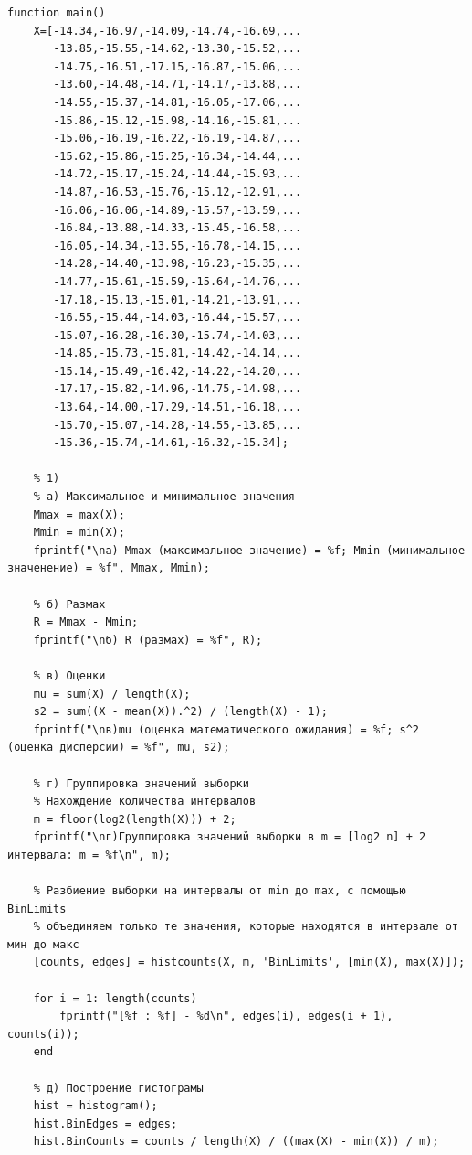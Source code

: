 \documentclass[a4paper,oneside,12pt]{extreport}
\theoremstyle{indented}
\begin{document}
\hfill 
\begin{lstlisting}[caption=Реализация]
function main()
    X=[-14.34,-16.97,-14.09,-14.74,-16.69,...
       -13.85,-15.55,-14.62,-13.30,-15.52,...
       -14.75,-16.51,-17.15,-16.87,-15.06,...
       -13.60,-14.48,-14.71,-14.17,-13.88,...
       -14.55,-15.37,-14.81,-16.05,-17.06,...
       -15.86,-15.12,-15.98,-14.16,-15.81,...
       -15.06,-16.19,-16.22,-16.19,-14.87,...
       -15.62,-15.86,-15.25,-16.34,-14.44,...
       -14.72,-15.17,-15.24,-14.44,-15.93,...
       -14.87,-16.53,-15.76,-15.12,-12.91,...
       -16.06,-16.06,-14.89,-15.57,-13.59,...
       -16.84,-13.88,-14.33,-15.45,-16.58,...
       -16.05,-14.34,-13.55,-16.78,-14.15,...
       -14.28,-14.40,-13.98,-16.23,-15.35,...
       -14.77,-15.61,-15.59,-15.64,-14.76,...
       -17.18,-15.13,-15.01,-14.21,-13.91,...
       -16.55,-15.44,-14.03,-16.44,-15.57,...
       -15.07,-16.28,-16.30,-15.74,-14.03,...
       -14.85,-15.73,-15.81,-14.42,-14.14,...
       -15.14,-15.49,-16.42,-14.22,-14.20,...
       -17.17,-15.82,-14.96,-14.75,-14.98,...
       -13.64,-14.00,-17.29,-14.51,-16.18,...
       -15.70,-15.07,-14.28,-14.55,-13.85,...
       -15.36,-15.74,-14.61,-16.32,-15.34];
    
    % 1)
    % а) Максимальное и минимальное значения
    Mmax = max(X);
    Mmin = min(X);
    fprintf("\nа) Mmax (максимальное значение) = %f; Mmin (минимальное значенение) = %f", Mmax, Mmin);
    
    % б) Размах
    R = Mmax - Mmin;
    fprintf("\nб) R (размах) = %f", R);
    
    % в) Оценки
    mu = sum(X) / length(X);
    s2 = sum((X - mean(X)).^2) / (length(X) - 1);
    fprintf("\nв)mu (оценка математического ожидания) = %f; s^2 (оценка дисперсии) = %f", mu, s2);
    
    % г) Группировка значений выборки
    % Нахождение количества интервалов
    m = floor(log2(length(X))) + 2;
    fprintf("\nг)Группировка значений выборки в m = [log2 n] + 2 интервала: m = %f\n", m);
    
    % Разбиение выборки на интервалы от min до max, с помощью BinLimits
    % объединяем только те значения, которые находятся в интервале от мин до макс
    [counts, edges] = histcounts(X, m, 'BinLimits', [min(X), max(X)]);
    
    for i = 1: length(counts)
        fprintf("[%f : %f] - %d\n", edges(i), edges(i + 1), counts(i));
    end
    
    % д) Построение гистограмы
    hist = histogram();
    hist.BinEdges = edges;
    hist.BinCounts = counts / length(X) / ((max(X) - min(X)) / m);
    

\end{lstlisting}
\end{document}
